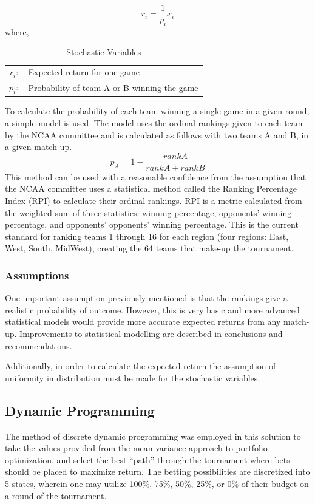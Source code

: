 \documentclass[12pt]{article}
\begin{document}
\begin{equation*}
r_i=\frac{1}{p_i}x_i
\end{equation*}
where,

\begin{table}[htbp!]
\begin{centering}
    \begin{tabular}{r l}
    $r_i:$      & Expected return for one game \\ 
    $p_i:$      & Probability of team A or B winning the game \\ 
    \end{tabular}
    \label{op_vars}
    \caption{Stochastic Variables}
\end{centering}
\end{table}

To calculate the probability of each team winning a single game in a given round, a simple model is used.
The model uses the ordinal rankings given to each team by the NCAA committee and is calculated as follows with two teams A and B, in a given match-up.
\begin{equation}
p_A = 1 - \frac{rank A}{rank A + rank B}
\end{equation}
This method can be used with a reasonable confidence from the assumption that the NCAA committee uses a statistical method called the Ranking Percentage Index (RPI) to calculate their ordinal rankings.
RPI is a metric calculated from the weighted sum of three statistics: winning percentage, opponents' winning percentage, and opponents' opponents' winning percentage. 
This is the current standard for ranking teams 1 through 16 for each region (four regions: East, West, South, MidWest), creating the 64 teams that make-up the tournament.

\subsubsection{Assumptions}
One important assumption previously mentioned is that the rankings give a realistic probability of outcome.
However, this is very basic and more advanced statistical models would provide more accurate expected returns from any match-up.
Improvements to statistical modelling are described in conclusions and recommendations.

Additionally, in order to calculate the expected return the assumption of uniformity in distribution must be made for the stochastic variables.

\subsection{Dynamic Programming}
The method of discrete dynamic programming was employed in this solution to take the values provided from the mean-variance approach to portfolio optimization, and select the best ``path'' through the tournament where bets should be placed to maximize return.
The betting possibilities are discretized into 5 states, wherein one may utilize 100\%, 75\%, 50\%, 25\%, or 0\% of their budget on a round of the tournament.
\end{document}
